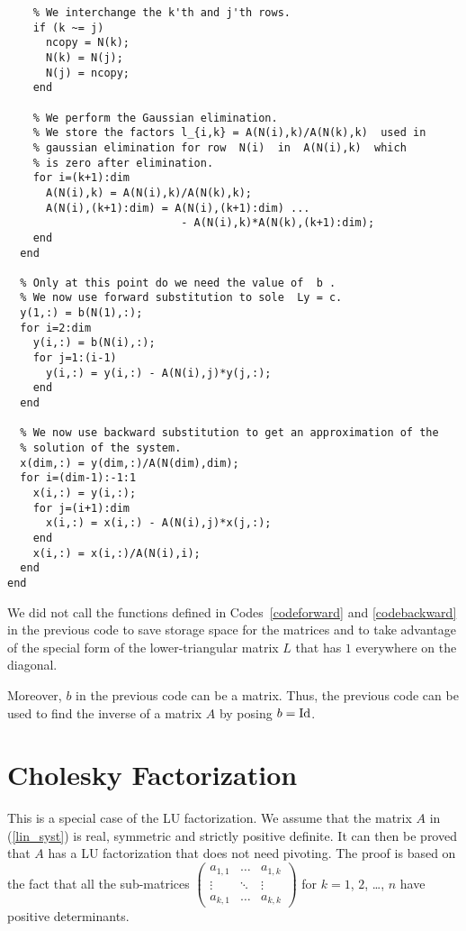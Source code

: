 \begin{code}[LU Decomposition]
\begin{verbatim}
    % We interchange the k'th and j'th rows.
    if (k ~= j)
      ncopy = N(k);
      N(k) = N(j);
      N(j) = ncopy;
    end

    % We perform the Gaussian elimination.
    % We store the factors l_{i,k} = A(N(i),k)/A(N(k),k)  used in
    % gaussian elimination for row  N(i)  in  A(N(i),k)  which
    % is zero after elimination.
    for i=(k+1):dim
      A(N(i),k) = A(N(i),k)/A(N(k),k);
      A(N(i),(k+1):dim) = A(N(i),(k+1):dim) ...
                           - A(N(i),k)*A(N(k),(k+1):dim);
    end
  end

  % Only at this point do we need the value of  b .
  % We now use forward substitution to sole  Ly = c.
  y(1,:) = b(N(1),:);
  for i=2:dim
    y(i,:) = b(N(i),:);
    for j=1:(i-1)
      y(i,:) = y(i,:) - A(N(i),j)*y(j,:);
    end
  end

  % We now use backward substitution to get an approximation of the
  % solution of the system.
  x(dim,:) = y(dim,:)/A(N(dim),dim);
  for i=(dim-1):-1:1
    x(i,:) = y(i,:);
    for j=(i+1):dim
      x(i,:) = x(i,:) - A(N(i),j)*x(j,:);
    end
    x(i,:) = x(i,:)/A(N(i),i);
  end
end
\end{verbatim}
\end{code}

We did not call the functions defined in Codes~\ref{codeforward} and 
\ref{codebackward} in the previous code to save storage space for the
matrices and to take advantage of the special form of the
lower-triangular matrix $L$ that has $1$ everywhere on the diagonal.

Moreover, $b$ in the previous code can be a matrix.  Thus, the
previous code can be used to find the inverse of a matrix $A$ by
posing $b = \operatorname{Id}$.

\section{Cholesky Factorization}

This is a special case of the LU factorization.  We assume that the
matrix $A$ in (\ref{lin_syst}) is real, symmetric and strictly
positive definite.  It can then be proved that $A$ has a LU
factorization that does not need pivoting.  The proof is based on the
fact that all the sub-matrices
$\displaystyle
\begin{pmatrix}
a_{1,1} & \ldots & a_{1,k} \\
\vdots & \ddots & \vdots \\
a_{k,1} & \ldots & a_{k,k}
\end{pmatrix}$ for $k=1$, $2$, \ldots, $n$
have positive determinants.

